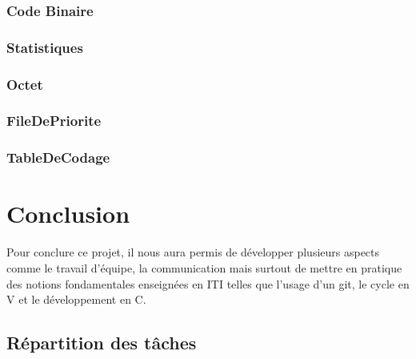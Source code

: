 \documentclass{article}
\begin{document}
\subsubsection{\textbf{Code Binaire}}


\subsubsection{\textbf{Statistiques}}


\subsubsection{\textbf{Octet}}


\subsubsection{\textbf{FileDePriorite}}


\subsubsection{\textbf{TableDeCodage}}




\newpage


\section{Conclusion}


Pour conclure ce projet, il nous aura permis de développer plusieurs aspects comme le travail d'équipe, la communication mais surtout de mettre en pratique des notions fondamentales enseignées en ITI telles que l'usage d'un git, le cycle en V et le développement en C. 

\subsection{Répartition des tâches}
\end{document}
